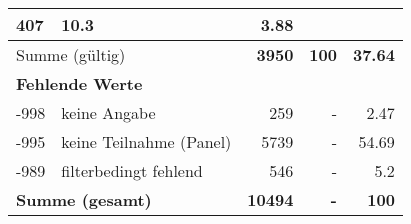 \begin{longtable}{lXrrr}
       \num{407} &
       \num[round-mode=places,round-precision=2]{10.3} &
         \num[round-mode=places,round-precision=2]{3.88} \\
     \midrule
     \multicolumn{2}{l}{Summe (gültig)} &
       \textbf{\num{3950}} &
     \textbf{\num{100}} &
       \textbf{\num[round-mode=places,round-precision=2]{37.64}} \\
     \multicolumn{5}{l}{\textbf{Fehlende Werte}}\\
       -998 &
       keine Angabe &
         \num{259} &
        - &
         \num[round-mode=places,round-precision=2]{2.47} \\
       -995 &
       keine Teilnahme (Panel) &
         \num{5739} &
        - &
         \num[round-mode=places,round-precision=2]{54.69} \\
       -989 &
       filterbedingt fehlend &
         \num{546} &
        - &
         \num[round-mode=places,round-precision=2]{5.2} \\
     \midrule
     \multicolumn{2}{l}{\textbf{Summe (gesamt)}} &
          \textbf{\num{10494}} &
        \textbf{-} &
        \textbf{\num{100}} \\
     \bottomrule
     \end{longtable}
     
